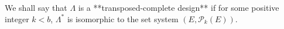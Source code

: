 We shall say that $\Lambda$ is a **transposed-complete design** if for some positive integer $k < b$, $\Lambda^*$ is isomorphic to the set system $(E, \mathcal{P}_k(E))$.
